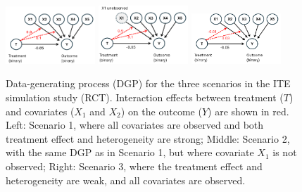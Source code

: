 \begin{figure}[H]
\centering
\includegraphics[width=0.3\textwidth]{img/results_ITE_simulation/simulation_observed.png}
\includegraphics[width=0.3\textwidth]{img/results_ITE_simulation/simulation_unobserved.png}
\includegraphics[width=0.3\textwidth]{img/results_ITE_simulation/simulation_small_effects.png}
\caption{Data-generating process (DGP) for the three scenarios in the ITE simulation study (RCT). Interaction effects between treatment ($T$) and covariates ($X_1$ and $X_2$) on the outcome ($Y$) are shown in red. Left: Scenario 1, where all covariates are observed and both treatment effect and heterogeneity are strong; Middle: Scenario 2, with the same DGP as in Scenario 1, but where covariate $X_1$ is not observed; Right: Scenario 3, where the treatment effect and heterogeneity are weak, and all covariates are observed.}
\label{fig:simulation_dags}
\end{figure}








